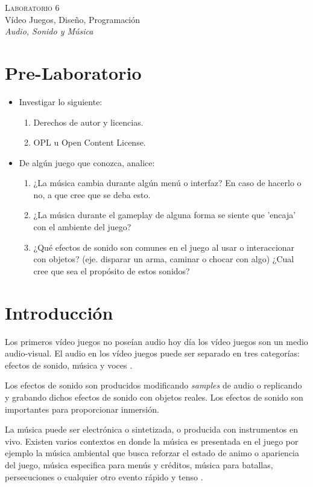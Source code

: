 \begin{center}
\textsc{\Large Laboratorio 6}~\\
{\large Vídeo Juegos, Diseño, Programación}~\\
\emph{Audio, Sonido y Música}
\end{center}

\section{Pre-Laboratorio}
\begin{itemize}
\item Investigar lo siguiente:
\begin{enumerate}
  \item Derechos de autor y licencias.
  \item OPL u Open Content License.
\end{enumerate}
\item De algún juego que conozca, analice:
\begin{enumerate}
  \item ¿La música cambia durante algún menú o interfaz? En caso de hacerlo o no, a que cree que se deba esto.
  \item ¿La música durante el gameplay de alguna forma se siente que 'encaja' con el ambiente del juego?
  \item ¿Qué efectos de sonido son comunes en el juego al usar o interaccionar con objetos? (eje. disparar un arma, caminar o chocar con algo) ¿Cual cree que sea el propósito de estos sonidos?
\end{enumerate}
\end{itemize}


\section{Introducción}
Los primeros vídeo juegos no poseían audio hoy día los vídeo juegos son un medio audio-visual. El audio en los vídeo juegos puede ser separado en tres categorías: efectos de sonido, música y voces \cite{erikgamedevelopment}\cite{valve_audio}.

Los efectos de sonido son producidos modificando \emph{samples} de audio o replicando y grabando dichos efectos de sonido con objetos reales. Los efectos de sonido son importantes para proporcionar inmersión. 

La música puede ser electrónica o sintetizada, o producida con instrumentos en vivo. Existen varios contextos en donde la música es presentada en el juego por ejemplo la música ambiental que busca reforzar el estado de animo o apariencia del juego, música especifica para menús y créditos, música para batallas, persecuciones o cualquier otro evento rápido y tenso \cite[p.~188]{bobbatesgamedesign}.

